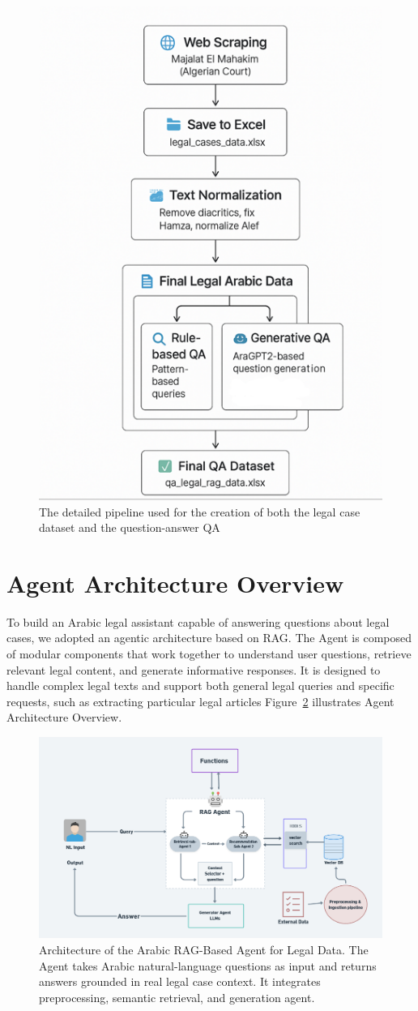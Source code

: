 \begin{figure}[h]
	\centering
	\includegraphics[width=0.5\linewidth]{Figures/dataC.png}
	\caption{The detailed pipeline used for the creation of both the legal case dataset and the  question-answer QA}
	\label{dataset_creation}
	
\end{figure}

\newpage
\section{Agent Architecture Overview}
To build an Arabic legal assistant capable of answering questions about legal cases, we adopted an agentic architecture based on  RAG. The Agent is composed of modular components that work together to understand user questions, retrieve relevant legal content, and generate informative responses. It is designed to handle complex legal texts and support both general legal queries and specific requests, such as extracting particular legal articles Figure~\ref{agentic_architecture} illustrates Agent Architecture Overview.
\begin{figure}[h]
	\centering
	\includegraphics[width=0.9\linewidth]{Figures/agentarchi.png}
	\caption{Architecture of the Arabic RAG-Based Agent for Legal Data. The Agent takes Arabic natural-language questions as input and returns answers grounded in real legal case context. It integrates preprocessing, semantic retrieval, and generation agent. }
	
	\label{agentic_architecture}
	
\end{figure}

